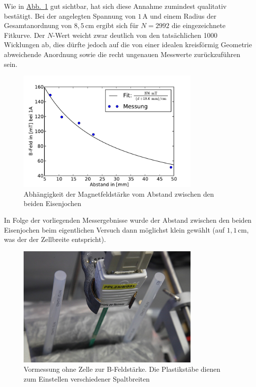 \documentclass[11pt]{scrartcl}
\newcommand{\unit}[1]{\ensuremath{\,\mathrm{#1}}} %
\newcommand{\abb}[1]{\hyperref[#1]{Abb.~\ref{#1}}}
\begin{document}
Wie in \abb{messung_B-Feld-Abstand} gut sichtbar, hat sich diese Annahme zumindest qualitativ bestätigt. Bei der angelegten Spannung von $1 \unit{A}$ und einem Radius der Gesamtanordnung von $8,5 \unit{cm}$ ergibt sich für $N=2992$ die eingezeichnete Fitkurve. Der $N$-Wert weicht zwar deutlich von den tatsächlichen 1000 Wicklungen ab, dies dürfte jedoch auf die von einer idealen kreisförmig Geometrie abweichende Anordnung sowie die recht ungenauen Messwerte zurückzuführen sein.

\begin{figure}[ht]
\begin{center}
\includegraphics[width=0.8\textwidth]{images/messung_B-Feld-Abstand.pdf}
\end{center}
\vspace{-1.5\baselineskip}
\caption{Abhängigkeit der Magnetfeldstärke vom Abstand zwischen den beiden Eisenjochen}
\label{messung_B-Feld-Abstand}
\end{figure}


In Folge der vorliegenden Messergebnisse wurde der Abstand zwischen den beiden Eisenjochen beim eigentlichen Versuch dann möglichst klein gewählt (auf $1,1 \unit{cm}$, was der der Zellbreite entspricht).


\begin{figure}[ht]
\begin{center}
\includegraphics[width=0.8\textwidth]{images/bfeld-vor1.jpg}
\end{center}
\vspace{-1.5\baselineskip}
\caption{Vormessung ohne Zelle zur B-Feldst\"arke. Die Plastikst\"abe dienen zum Einstellen verschiedener Spaltbreiten}
\label{bfeld-vor1}
\end{figure}
\end{document}
